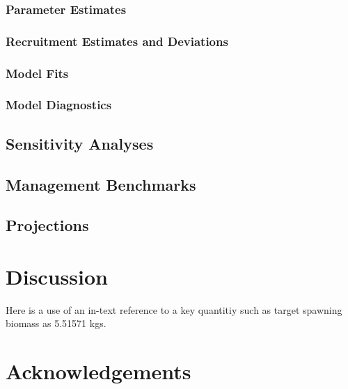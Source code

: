 \documentclass[
]{scrartcl}
\begin{document}
\subsubsection{Parameter Estimates}\label{parameter-estimates}

\subsubsection{Recruitment Estimates and
Deviations}\label{recruitment-estimates-and-deviations}

\subsubsection{Model Fits}\label{model-fits}

\subsubsection{Model Diagnostics}\label{model-diagnostics}

\newpage{}

\subsection{Sensitivity Analyses}\label{sensitivity-analyses}

\newpage{}

\subsection{Management Benchmarks}\label{management-benchmarks}

\newpage{}

\subsection{Projections}\label{projections}

\newpage{}

\section{Discussion}\label{discussion}

Here is a use of an in-text reference to a key quantitiy such as target
spawning biomass as 5.51571 kgs.

\newpage{}

\section{Acknowledgements}\label{sec-acknowledgements}
\end{document}
